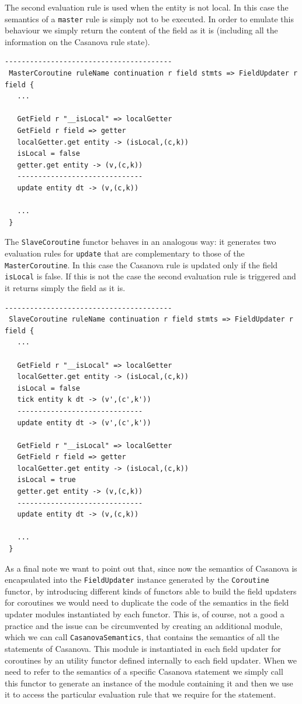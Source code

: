 \noindent
The second evaluation rule is used when the entity is not local. In this case the semantics of a \texttt{master} rule is simply not to be executed. In order to emulate this behaviour we simply return the content of the field as it is (including all the information on the Casanova rule state).
\begin{lstlisting}
----------------------------------------
 MasterCoroutine ruleName continuation r field stmts => FieldUpdater r field {
   ...
   
   GetField r "__isLocal" => localGetter
   GetField r field => getter
   localGetter.get entity -> (isLocal,(c,k))
   isLocal = false
   getter.get entity -> (v,(c,k))
   ------------------------------
   update entity dt -> (v,(c,k))
   
   ...
 }
\end{lstlisting}

\noindent
The \texttt{SlaveCoroutine} functor behaves in an analogous way: it generates two evaluation rules for \texttt{update} that are complementary to those of the \texttt{MasterCoroutine}. In this case the Casanova rule is updated only if the field \texttt{\tu\tu isLocal} is false. If this is not the case the second evaluation rule is triggered and it returns simply the field as it is.

\begin{lstlisting}
----------------------------------------
 SlaveCoroutine ruleName continuation r field stmts => FieldUpdater r field {
   ...

   GetField r "__isLocal" => localGetter
   localGetter.get entity -> (isLocal,(c,k))
   isLocal = false
   tick entity k dt -> (v',(c',k'))
   ------------------------------
   update entity dt -> (v',(c',k'))

   GetField r "__isLocal" => localGetter
   GetField r field => getter
   localGetter.get entity -> (isLocal,(c,k))
   isLocal = true
   getter.get entity -> (v,(c,k))
   ------------------------------
   update entity dt -> (v,(c,k))
   
   ... 
 }
\end{lstlisting}

\noindent
As a final note we want to point out that, since now the semantics of Casanova is encapsulated into the \texttt{FieldUpdater} instance generated by the \texttt{Coroutine} functor, by introducing different kinds of functors able to build the field updaters for coroutines we would need to duplicate the code of the semantics in the field updater modules instantiated by each functor. This is, of course, not a good a practice and the issue can be circumvented by creating an additional module, which we can call \texttt{CasanovaSemantics}, that contains the semantics of all the statements of Casanova. This module is instantiated in each field updater for coroutines by an utility functor defined internally to each field updater. When we need to refer to the semantics of a specific Casanova statement we simply call this functor to generate an instance of the module containing it and then we use it to access the particular evaluation rule that we require for the statement.

